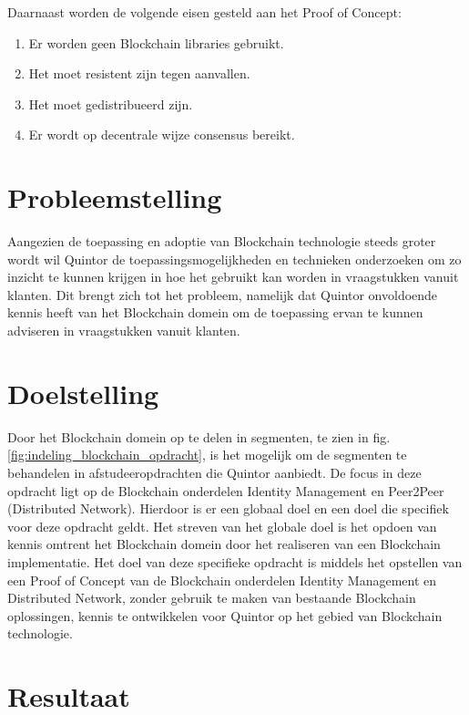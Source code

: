 Daarnaast worden de volgende eisen gesteld aan het Proof of Concept:
\begin{enumerate}[noitemsep]
  \item Er worden geen Blockchain libraries gebruikt.
  \item Het moet resistent zijn tegen aanvallen.
  \item Het moet gedistribueerd zijn.
  \item Er wordt op decentrale wijze consensus bereikt.
\end{enumerate}

\section{Probleemstelling}

Aangezien de toepassing en adoptie van Blockchain technologie steeds groter wordt wil Quintor de toepassingsmogelijkheden en technieken onderzoeken om zo inzicht te kunnen krijgen in hoe het gebruikt kan worden in vraagstukken vanuit klanten. Dit brengt zich tot het probleem, namelijk dat Quintor onvoldoende kennis heeft van het Blockchain domein om de toepassing ervan te kunnen adviseren in vraagstukken vanuit klanten.

\section{Doelstelling}

Door het Blockchain domein op te delen in segmenten, te zien in fig. \ref{fig:indeling_blockchain_opdracht}, is het mogelijk om de segmenten te behandelen in afstudeeropdrachten die Quintor aanbiedt. De focus in deze opdracht ligt op de Blockchain onderdelen Identity Management en Peer2Peer (Distributed Network). Hierdoor is er een globaal doel en een doel die specifiek voor deze opdracht geldt. Het streven van het globale doel is het opdoen van kennis omtrent het Blockchain domein door het realiseren van een Blockchain implementatie. Het doel van deze specifieke opdracht is middels het opstellen van een Proof of Concept van de Blockchain onderdelen Identity Management en Distributed Network, zonder gebruik te maken van bestaande Blockchain oplossingen, kennis te ontwikkelen voor Quintor op het gebied van Blockchain technologie.

\section{Resultaat}

